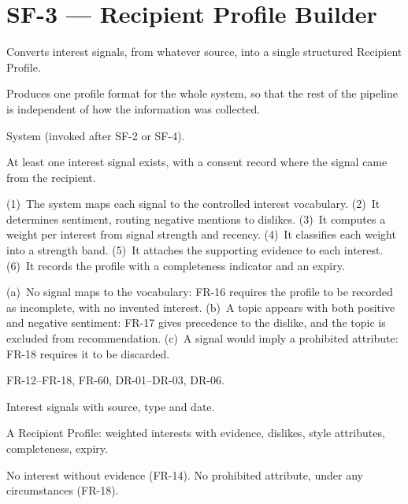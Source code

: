 \documentclass[11pt,a4paper]{report}
\begin{document}
\section{SF-3 --- Recipient Profile Builder}
\begin{description}[style=nextline,leftmargin=0pt]
\item[Description] Converts interest signals, from whatever source, into a single structured Recipient Profile.
\item[Purpose] Produces one profile format for the whole system, so that the rest of the pipeline is independent of how the information was collected.
\item[Actors] System (invoked after SF-2 or SF-4).
\item[Preconditions] At least one interest signal exists, with a consent record where the signal came from the recipient.
\item[Main flow] (1)~The system maps each signal to the controlled interest vocabulary. (2)~It determines sentiment, routing negative mentions to dislikes. (3)~It computes a weight per interest from signal strength and recency. (4)~It classifies each weight into a strength band. (5)~It attaches the supporting evidence to each interest. (6)~It records the profile with a completeness indicator and an expiry.
\item[Alternative and exception flows] (a)~No signal maps to the vocabulary: FR-16 requires the profile to be recorded as incomplete, with no invented interest. (b)~A topic appears with both positive and negative sentiment: FR-17 gives precedence to the dislike, and the topic is excluded from recommendation. (c)~A signal would imply a prohibited attribute: FR-18 requires it to be discarded.
\item[Requirements] FR-12--FR-18, FR-60, DR-01--DR-03, DR-06.
\item[Inputs] Interest signals with source, type and date.
\item[Outputs] A Recipient Profile: weighted interests with evidence, dislikes, style attributes, completeness, expiry.
\item[Constraints] No interest without evidence (FR-14). No prohibited attribute, under any circumstances (FR-18).
\end{description}
\end{document}
